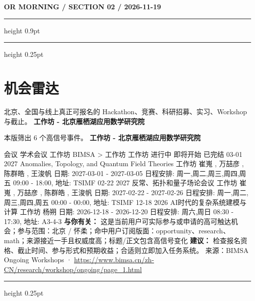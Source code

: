 \documentclass[10.5pt]{ctexart}
\begin{document}
\newpage
{\small\bfseries OR MORNING / SECTION 02 / 2026-11-19}
\vspace{2mm}
\hrule height 0.9pt
\vspace{1.5mm}
\hrule height 0.25pt
\vspace{4mm}
\section*{机会雷达}
{\color{ormuted} 北京、全国与线上真正可报名的 Hackathon、竞赛、科研招募、实习、Workshop 与截止。}
\vspace{2mm}
{\LARGE\bfseries 工作坊 - 北京雁栖湖应用数学研究院}\par
\vspace{1mm}
{\color{ormuted} 本版筛出 6 个高信号事件。}
\vspace{3mm}
{\Large\bfseries 工作坊 - 北京雁栖湖应用数学研究院}\par
会议 学术会议 工作坊 BIMSA > 工作坊 工作坊 进行中 即将开始 已完结 03-01 2027 Anomalies, Topology, and Quantum Field Theories 工作坊 崔嵬 , 万喆彦 , 陈群皓 , 王浚帆 日期: 2027-03-01 - 2027-03-05 日程安排: 周一,周二,周三,周四,周五 09:00 - 18:00, 地址: TSIMF 02-22 2027 反常、拓扑和量子场论会议 工作坊 崔嵬 , 万喆彦 , 陈群皓 , 王浚帆 日期: 2027-02-22 - 2027-02-26 日程安排: 周一,周二,周三,周四,周五 00:00 - 00:00, 地址: TSIMF 12-18 2026 AI时代的复杂系统建模与计算 工作坊 杨朔 日期: 2026-12-18 - 2026-12-20 日程安排: 周六,周日 08:30 - 17:30, 地址: A3-4-3
\textbf{与你有关：} 这是当前用户可实际参与或申请的高可触达机会；参与范围：北京 / 怀柔；命中用户订阅版面：opportunity、research、math；来源接近一手且权威度高；标题/正文包含高信号变化
\textbf{建议：} 检查报名资格、截止时间、参与形式和预期收益；合适则立即加入任务系统。
{\footnotesize\color{ormuted} 来源：BIMSA Ongoing Workshops · \url{https://www.bimsa.cn/zh-CN/research/workshop/ongoing/page_1.html}}
\vspace{4mm}
\hrule height 0.25pt
\vspace{3mm}
\end{document}
